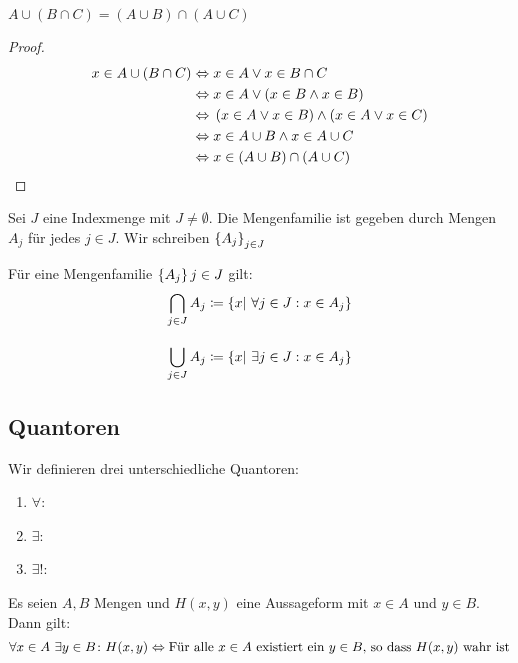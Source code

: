 \begin{lemma}[Distributivität]
    $A\cup (B \cap C) = (A\cup B) \cap (A\cup C)$
    \begin{proof}
        \begin{align*}
            x\in A \cup \left(B \cap C\right) &\Leftrightarrow{} x\in A \lor x\in B \cap C\\
            &\Leftrightarrow{} x\in A \lor \left(x\in B \land x \in B\right)\\
            &\Leftrightarrow{} \left(x\in A \lor x\in B\right)\land\left(x\in A \lor x\in C\right)\\
            &\Leftrightarrow{} x\in A \cup B\land x \in A \cup C\\
            &\Leftrightarrow{} x\in \left(A \cup B\right)\cap\left(A\cup C\right)\qedhere
        \end{align*}
    \end{proof}
\end{lemma}

\begin{definition}
    Sei $J$ eine Indexmenge mit $J\neq \emptyset$. Die Mengenfamilie ist gegeben durch Mengen $A_{j}$ für jedes $j\in J$. Wir schreiben $\left\{A_j\right\}_{j\in J}$
\end{definition}

\begin{definition}
    Für eine Mengenfamilie $\left\{A_j\right\}j\in J$ gilt:
    \begin{align*}
        \bigcap_{j\in J} A_j &\coloneqq \left\{x|~\forall j\in J: x\in A_j\right\}\\[10pt]
        \bigcup_{j\in J} A_j &\coloneqq \left\{x|~\exists j\in J: x\in A_j\right\}
    \end{align*}
\end{definition}

\subsection{Quantoren}

\begin{definition}[Quantoren]
    Wir definieren drei unterschiedliche Quantoren:
    \theoremescape
    \begin{enumerate}[label=(\roman*)]
        \item $\forall$: 
        \item $\exists$: 
        \item $\exists!$: 
    \end{enumerate}
    \vspace{0.2cm}
    Es seien $A,B$ Mengen und $H(x,y)$ eine Aussageform mit $x\in A$ und $y \in B$. Dann gilt:
    \begin{align*}
        \forall x \in A~\exists y \in B\colon H(x,y) \Leftrightarrow{} \text{Für alle $x\in A$ existiert ein $y \in B$, so dass $H(x,y)$ wahr ist}
    \end{align*}
\end{definition}

